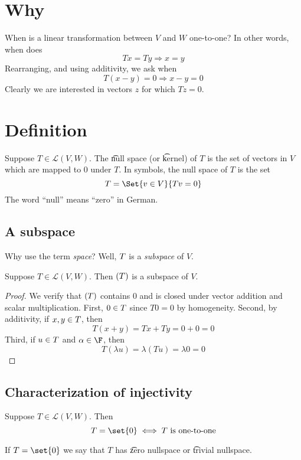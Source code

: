 
\section*{Why}

When is a linear transformation between $V$ and $W$ one-to-one?
In other words, when does
\[
Tx = Ty \Rightarrow x = y
\]
Rearranging, and using additivity, we ask when
\[
T(x - y) = 0 \Rightarrow x - y = 0
\]
Clearly we are interested in vectors $z$ for which $Tz = 0$.

\section*{Definition}

Suppose $T \in \mathcal{L} (V, W)$.
The \t{null space} (or \t{kernel}) of $T$ is the set of vectors in $V$ which are mapped to $0$ under $T$.
In symbols, the null space of $T$ is the set
\[
\null T = \Set{v \in V}{Tv = 0}
\]
The word ``null'' means ``zero'' in German.

\subsection*{A subspace}

Why use the term \textit{space}?
Well, $\null T$ is a \textit{subspace} of $V$.

\begin{proposition}
Suppose $T \in \mathcal{L} (V, W)$.
Then $\null(T)$ is a subspace of $V$.
\end{proposition}

\begin{proof}We verify that $\null(T)$ contains $0$ and is closed under vector addition and scalar multiplication.
First, $0 \in \null T$ since $T0 = 0$ by homogeneity.
Second, by additivity, if $x, y \in \null T$, then
\[
T(x + y) = Tx + Ty = 0 + 0 = 0
\]
Third, if $u \in \null T$ and $\alpha  \in \F $, then
\[
T(\lambda u) = \lambda (Tu) = \lambda 0 = 0
\]\end{proof}
\subsection*{Characterization of injectivity}

\begin{proposition}
Suppose $T \in \mathcal{L} (V, W)$.
Then
\[
\null T = \set{0} \iff T \text{ is one-to-one}
\]
\end{proposition}

If $\null T = \set{0}$ we say that $T$ has \t{zero nullspace} or \t{trivial nullspace}.

